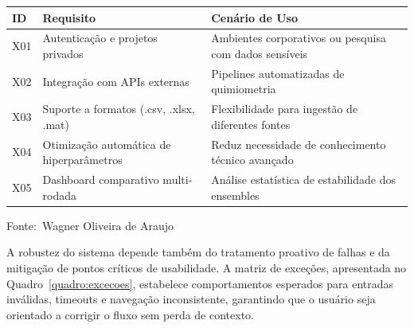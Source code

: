 \documentclass[12pt,a4paper]{article}
\newcommand{\oautor}{Wagner Oliveira de Araujo}
\begin{document}
\begin{quadro}[ht]
\centering
\small
\caption{Requisitos extras para fases futuras (Could Have)}
\label{quadro:extras}
\begin{threeparttable}
\begin{tabularx}{\textwidth}{|l|X|X|} \hline
\textbf{ID} & \textbf{Requisito} & \textbf{Cenário de Uso} \\ \hline
X01 & Autenticação e projetos privados & Ambientes corporativos ou pesquisa com dados sensíveis \\ \hline
X02 & Integração com APIs externas & Pipelines automatizadas de quimiometria \\ \hline
X03 & Suporte a formatos (.csv, .xlsx, .mat) & Flexibilidade para ingestão de diferentes fontes \\ \hline
X04 & Otimização automática de hiperparâmetros & Reduz necessidade de conhecimento técnico avançado \\ \hline
X05 & Dashboard comparativo multi-rodada & Análise estatística de estabilidade dos ensembles \\ \hline
\end{tabularx}
\begin{tablenotes}[flushleft]
\footnotesize
\item Fonte:~\oautor
\end{tablenotes}
\end{threeparttable}
\end{quadro}

A robustez do sistema depende também do tratamento proativo de falhas e da mitigação de pontos críticos de usabilidade. A matriz de exceções, apresentada no Quadro~\ref{quadro:excecoes}, estabelece comportamentos esperados para entradas inválidas, timeouts e navegação inconsistente, garantindo que o usuário seja orientado a corrigir o fluxo sem perda de contexto.
\end{document}
